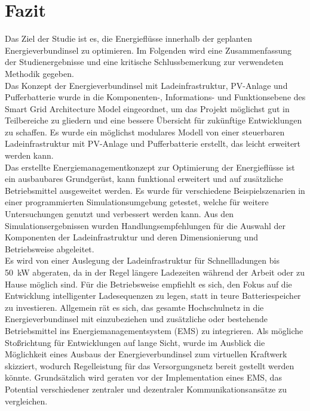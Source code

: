\chapter{Fazit}
\label{Kap6}
	Das Ziel der Studie ist es, die Energieflüsse innerhalb der geplanten Energieverbundinsel zu optimieren. Im Folgenden wird eine Zusammenfassung der Studienergebnisse und eine kritische Schlussbemerkung zur verwendeten Methodik gegeben. \\

    Das Konzept der Energieverbundinsel mit Ladeinfrastruktur, PV-Anlage und Pufferbatterie wurde in die Komponenten-, Informations- und Funktionsebene des Smart Grid Architecture Model eingeordnet, um das Projekt möglichst gut in Teilbereiche zu gliedern und eine bessere Übersicht für zukünftige Entwicklungen zu schaffen. Es wurde ein möglichst modulares Modell von einer steuerbaren Ladeinfrastruktur mit PV-Anlage und Pufferbatterie erstellt, das leicht erweitert werden kann. \\

	Das erstellte Energiemanagementkonzept zur Optimierung der Energieflüsse ist ein ausbaubares Grundgerüst, kann funktional erweitert und auf zusätzliche Betriebsmittel ausgeweitet werden. Es wurde für verschiedene Beispielszenarien in einer programmierten Simulationsumgebung getestet, welche für weitere Untersuchungen genutzt und verbessert werden kann. Aus den Simulationsergebnissen wurden Handlungsempfehlungen für die Auswahl der Komponenten der Ladeinfrastruktur und deren Dimensionierung und Betriebsweise abgeleitet. \\
    
    Es wird von einer Auslegung der Ladeinfrastruktur für Schnellladungen bis 50~kW abgeraten, da in der Regel längere Ladezeiten während der Arbeit oder zu Hause möglich sind. Für die Betriebsweise empfiehlt es sich, den Fokus auf die Entwicklung intelligenter Ladesequenzen zu legen, statt in teure Batteriespeicher zu investieren. Allgemein rät es sich, das gesamte Hochschulnetz in die Energieverbundinsel mit einzubeziehen und zusätzliche oder bestehende Betriebsmittel ins Energiemanagementsystem (EMS) zu integrieren. Als mögliche Stoßrichtung für Entwicklungen auf lange Sicht, wurde im Ausblick die Möglichkeit eines Ausbaus der Energieverbundinsel zum virtuellen Kraftwerk skizziert, wodurch Regelleistung für das Versorgungsnetz bereit gestellt werden könnte. Grundsätzlich wird geraten vor der Implementation eines EMS, das Potential verschiedener zentraler und dezentraler Kommunikationsansätze zu vergleichen. \\

